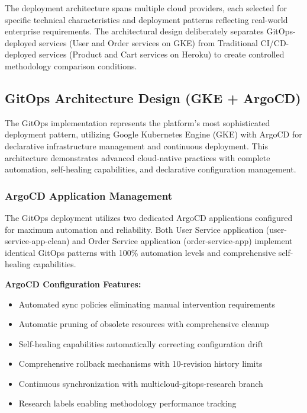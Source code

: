 The deployment architecture spans multiple cloud providers, each selected for specific technical characteristics and deployment patterns reflecting real-world enterprise requirements. The architectural design deliberately separates GitOps-deployed services (User and Order services on GKE) from Traditional CI/CD-deployed services (Product and Cart services on Heroku) to create controlled methodology comparison conditions.

\subsection{GitOps Architecture Design (GKE + ArgoCD)}

The GitOps implementation represents the platform's most sophisticated deployment pattern, utilizing Google Kubernetes Engine (GKE) with ArgoCD for declarative infrastructure management and continuous deployment. This architecture demonstrates advanced cloud-native practices with complete automation, self-healing capabilities, and declarative configuration management.

\subsubsection{ArgoCD Application Management}

The GitOps deployment utilizes two dedicated ArgoCD applications configured for maximum automation and reliability. Both User Service application (user-service-app-clean) and Order Service application (order-service-app) implement identical GitOps patterns with 100\% automation levels and comprehensive self-healing capabilities.

\textbf{ArgoCD Configuration Features:}
\begin{itemize}
\item Automated sync policies eliminating manual intervention requirements
\item Automatic pruning of obsolete resources with comprehensive cleanup
\item Self-healing capabilities automatically correcting configuration drift
\item Comprehensive rollback mechanisms with 10-revision history limits
\item Continuous synchronization with multicloud-gitops-research branch
\item Research labels enabling methodology performance tracking
\end{itemize}

